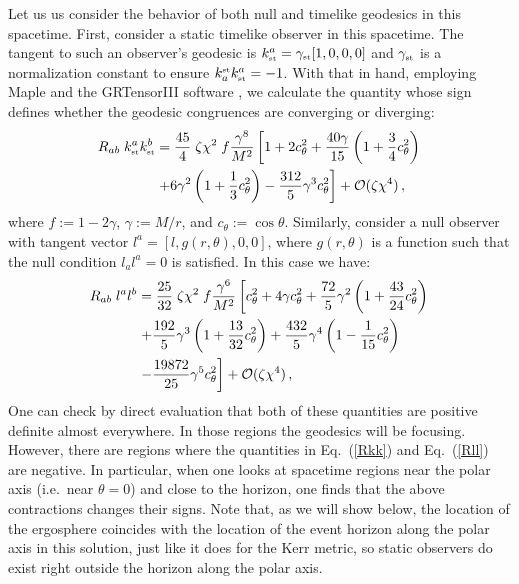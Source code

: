 \documentclass[prd,twocolumn,showpacs,superscriptaddress,nofootinbib]{revtex4-2}
\newcommand{\static}{\mbox{\tiny st}}
\begin{document}
Let us us consider the behavior of both null and timelike geodesics in this spacetime. First, consider a static timelike observer in this spacetime. The tangent to such an observer's geodesic is $k^a_{\static} = \gamma_{\static} [1,0,0,0]$ and $\gamma_{\static}$ is a normalization constant to ensure $k_a^{\static} k^a_{\static} = -1$. With that in hand, employing Maple and the GRTensorIII software \cite{grtensor}, we calculate the quantity whose sign defines whether the 
geodesic congruences are converging or diverging: 
%
\begin{align}
R_{a b} \; k_{\static}^a k^b_{\static} &= \frac{45}{4} \; \zeta \chi^2 \; f  \frac{\gamma^8}{M^{2}} 
\left[
1 + 2 c_{\theta}^2 + \frac{40\gamma}{15} \left(1 + \frac{3}{4} c_{\theta}^2 \right)
\right. 
\nonumber \\
&\left.
+ 6 \gamma^2 \left(1 + \frac{1}{3}  c_{\theta}^2\right) - \frac{312}{5} \gamma^3 c_{\theta}^2
\right] + {\cal{O}}(\zeta \chi^4)\,,
\label{Rkk}
\end{align}
where $f := 1 - 2 \gamma$, $\gamma := M/r$, and $c_\theta := \cos{\theta}$. 
Similarly, consider a null observer with tangent vector $l^a = [l, g(r,\theta), 0,0]$, where $g(r,\theta)$ is a function such that the null condition $l_al^a=0$ is satisfied. In this case we have:
\begin{align}
    R_{a b} \; l^a l^b &= \frac{25}{32} \; \zeta\chi^2 \; f \frac{\gamma^6}{M^2} \left[c_\theta^2 + 4\gamma c_\theta^2 
  + \frac{72}{5}\gamma^2 \left(1 + \frac{43}{24}c_\theta^2\right) \right. \nonumber \\ &\left. + \frac{192}{5}\gamma^3 \left(1 + \frac{13}{32}c_\theta^2\right) 
  + \frac{432}{5}\gamma^4\left(1 - \frac{1}{15}c_\theta^2\right)\right. \nonumber \\ &\left.  - \frac{19872}{25}\gamma^5 c_\theta^2\right] +{\cal{O}}(\zeta \chi^4)\,,
  \label{Rll}
\end{align}
One can check by direct evaluation that both of these quantities are positive definite almost everywhere. In those regions 
the geodesics will be focusing. However, there are  regions where the quantities in Eq.~(\ref {Rkk}) and Eq.~(\ref {Rll}) are negative. 
 In particular, when one looks at spacetime regions near the polar axis (i.e.~near $\theta = 0$) and close to the horizon, one finds that the above contractions changes their signs. Note that, as we will show below, the location of the ergosphere coincides with the location of the event horizon along the polar axis in this solution, just like it does for the Kerr metric, so static observers do exist right outside the horizon along the polar axis. 
\end{document}
